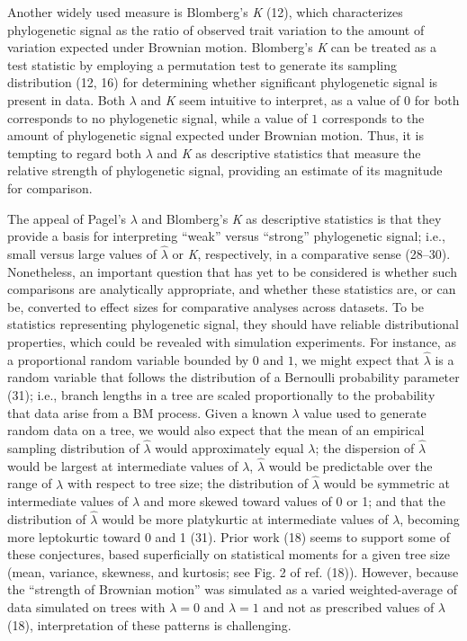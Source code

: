 \documentclass[9pt,twocolumn,twoside,lineno]{pnas-new}
\begin{document}
Another widely used measure is Blomberg's \emph{K} (12), which
characterizes phylogenetic signal as the ratio of observed trait
variation to the amount of variation expected under Brownian motion.
Blomberg's \emph{K} can be treated as a test statistic by employing a
permutation test to generate its sampling distribution (12, 16) for
determining whether significant phylogenetic signal is present in data.
Both \(\lambda\) and \emph{K} seem intuitive to interpret, as a value of
\(0\) for both corresponds to no phylogenetic signal, while a value of
\(1\) corresponds to the amount of phylogenetic signal expected under
Brownian motion. Thus, it is tempting to regard both \(\lambda\) and
\emph{K} as descriptive statistics that measure the relative strength of
phylogenetic signal, providing an estimate of its magnitude for
comparison.

The appeal of Pagel's \(\lambda\) and Blomberg's \emph{K} as descriptive
statistics is that they provide a basis for interpreting ``weak'' versus
``strong'' phylogenetic signal; i.e., small versus large values of
\(\hat{\lambda}\) or \emph{K}, respectively, in a comparative sense
(28--30). Nonetheless, an important question that has yet to be
considered is whether such comparisons are analytically appropriate, and
whether these statistics are, or can be, converted to effect sizes for
comparative analyses across datasets. To be statistics representing
phylogenetic signal, they should have reliable distributional
properties, which could be revealed with simulation experiments. For
instance, as a proportional random variable bounded by \(0\) and \(1\),
we might expect that \(\hat{\lambda}\) is a random variable that follows
the distribution of a Bernoulli probability parameter (31); i.e., branch
lengths in a tree are scaled proportionally to the probability that data
arise from a BM process. Given a known \(\lambda\) value used to
generate random data on a tree, we would also expect that the mean of an
empirical sampling distribution of \(\hat{\lambda}\) would approximately
equal \(\lambda\); the dispersion of \(\hat{\lambda}\) would be largest
at intermediate values of \(\lambda\), \(\hat{\lambda}\) would be
predictable over the range of \(\lambda\) with respect to tree size; the
distribution of \(\hat{\lambda}\) would be symmetric at intermediate
values of \(\lambda\) and more skewed toward values of 0 or 1; and that
the distribution of \(\hat{\lambda}\) would be more platykurtic at
intermediate values of \(\lambda\), becoming more leptokurtic toward 0
and 1 (31). Prior work (18) seems to support some of these conjectures,
based superficially on statistical moments for a given tree size (mean,
variance, skewness, and kurtosis; see Fig. 2 of ref. (18)). However,
because the ``strength of Brownian motion'' was simulated as a varied
weighted-average of data simulated on trees with \(\lambda=0\) and
\(\lambda=1\) and not as prescribed values of \(\lambda\) (18),
interpretation of these patterns is challenging.
\end{document}
